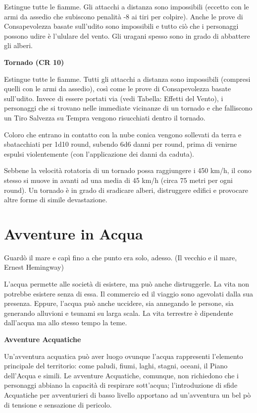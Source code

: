 \documentclass[a4paper,11pt,twoside,openany]{book}
\begin{document}
Estingue tutte le fiamme. Gli attacchi a distanza sono impossibili (eccetto con le armi da assedio che subiscono penalità -8 ai tiri per colpire). Anche le prove di Consapevolezza basate sull'udito sono impossibili e tutto ciò che i personaggi possono udire è l'ululare del vento. Gli uragani spesso sono in grado di abbattere gli alberi.

\textbf{Tornado (CR 10)}

Estingue tutte le fiamme. Tutti gli attacchi a distanza sono impossibili (compresi quelli con le armi da assedio), così come le prove di Consapevolezza basate sull'udito. Invece di essere portati via (vedi Tabella: Effetti del Vento), i personaggi che si trovano nelle immediate vicinanze di un tornado e che falliscono un Tiro Salvezza su Tempra vengono risucchiati dentro il tornado.

Coloro che entrano in contatto con la nube conica vengono sollevati da terra e sbatacchiati per 1d10 round, subendo 6d6 danni per round, prima di venirne espulsi violentemente (con l'applicazione dei danni da caduta).

Sebbene la velocità rotatoria di un tornado possa raggiungere i 450 km/h, il cono stesso si muove in avanti ad una media di 45 km/h (circa 75 metri per ogni round). Un tornado è in grado di sradicare alberi, distruggere edifici e provocare altre forme di simile devastazione.

\pagebreak

\section{Avventure in Acqua}

\label{avventure-in-acqua}
\begin{tcolorbox}[enhanced,arc=5pt,boxrule=0.3pt]{Guardò il mare e capì fino a che punto era solo, adesso. (Il vecchio e il mare, Ernest Hemingway)}\end{tcolorbox}\medskip

L'acqua permette alle società di esistere, ma può anche distruggerle. La vita non potrebbe esistere senza di essa. Il commercio ed il viaggio sono agevolati dalla sua presenza. Eppure, l'acqua può anche uccidere, sia annegando le persone, sia generando alluvioni e tsunami su larga scala. La vita terrestre è dipendente dall'acqua ma allo stesso tempo la teme.

\textbf{Avventure Acquatiche}

Un'avventura acquatica può aver luogo ovunque l'acqua rappresenti l'elemento principale del territorio: come paludi, fiumi, laghi, stagni, oceani, il Piano dell'Acqua e simili. Le avventure Acquatiche, comunque, non richiedono che i personaggi abbiano la capacità di respirare sott'acqua; l'introduzione di sfide Acquatiche per avventurieri di basso livello apportano ad un'avventura un bel pò di tensione e sensazione di pericolo.
\end{document}
